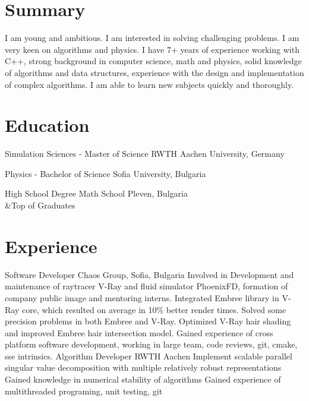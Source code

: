 \section*{Summary} 
I am young and ambitious. I am interested in solving challenging
problems. I am very keen on algorithms and physics. I have 7+ years of
experience working with C++, strong background in computer
science, math and physics, solid knowledge of algorithms and
data structures, experience with the design and implementation
of complex algorithms. I am able to learn new subjects quickly and
thoroughly.
\section*{Education}
{Simulation Sciences - Master of Science}
{RWTH Aachen University, Germany}

{Physics - Bachelor of Science}
{Sofia University, Bulgaria}

{High School Degree}
{Math School Pleven, Bulgaria\\ &Top of Graduates}
\section*{Experience}
{Software Developer}
{Chaos Group, Sofia, Bulgaria}
{Involved in Development and maintenance of raytracer V-Ray and fluid simulator PhoenixFD, formation of company public image and mentoring interns.}
{Integrated Embree library in V-Ray core, which resulted on average in 10\% better render times. Solved some precision problems in both Embree and V-Ray. Optimized V-Ray hair shading and improved Embree hair intersection model.}
{Gained experience of cross platform software development, working in large team, code reviews, git, cmake, sse intrinsics.}
{Algorithm Developer}
{RWTH Aachen}
{Implement scalable parallel singular value decomposition with multiple relatively robust representations}
{Gained knowledge in numerical stability of algorithms}
{Gained experience of multithreaded programing, unit testing, git}

